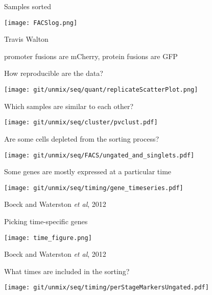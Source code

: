 \documentclass[serif,9pt]{beamer}
\begin{document}
\begin{frame}{Samples sorted}

\texttt{[image: FACSlog.png]}

\hfill Travis Walton

{\small promoter fusions are mCherry, protein fusions are GFP}

\end{frame}

\begin{frame}{How reproducible are the data?}

\texttt{[image: git/unmix/seq/quant/replicateScatterPlot.png]}

\end{frame}

\begin{frame}{Which samples are similar to each other?}

\texttt{[image: git/unmix/seq/cluster/pvclust.pdf]}

\end{frame}

\begin{frame}{Are some cells depleted from the sorting process?}

\texttt{[image: git/unmix/seq/FACS/ungated\_and\_singlets.pdf]}

\end{frame}


\begin{frame}{Some genes are mostly expressed at a particular time}

\texttt{[image: git/unmix/seq/timing/gene\_timeseries.pdf]}

\hfill Boeck and Waterston {\em et al}, 2012

\end{frame}

\begin{frame}{Picking time-specific genes}

\texttt{[image: time\_figure.png]}

\hfill Boeck and Waterston {\em et al}, 2012

\end{frame}

\begin{frame}{What times are included in the sorting?}

\begin{centering}
\texttt{[image: git/unmix/seq/timing/perStageMarkersUngated.pdf]}
\end{centering}

\end{frame}
\end{document}
